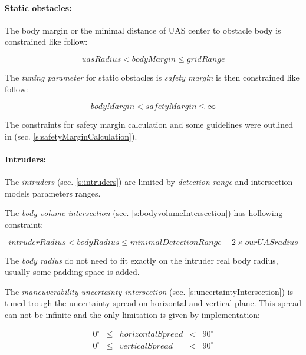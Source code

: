 \paragraph{Static obstacles:} The body margin or the minimal distance of UAS center to obstacle body is constrained like follow:

\begin{equation*}
    uas Radius < body Margin \le grid Range
\end{equation*}

The \emph{tuning parameter} for static obstacles is \emph{safety margin} is then constrained like follow:

\begin{equation*}
    body Margin < safety Margin \le \infty
\end{equation*}


The constraints for safety margin calculation and some guidelines were outlined in (sec. \ref{s:safetyMarginCalculation}).

\paragraph{Intruders:} The \emph{intruders} (sec. \ref{s:intruders}) are limited by \emph{detection range} and intersection models parameters ranges. 

The \emph{body volume intersection} (sec. \ref{s:bodyvolumeIntersection}) has hollowing constraint:

\begin{equation*}
    intruder Radius < body Radius \le minimal Detection Range - 2 \times our UAS radius
\end{equation*}

\begin{note}
    The \emph{body radius} do not need to fit exactly on the intruder real body radius, usually some padding space is added.
\end{note}

The \emph{maneuverability uncertainty intersection} (sec. \ref{s:uncertaintyIntersection}) is tuned trough the uncertainty spread on horizontal and vertical plane. This spread can not be infinite and the only limitation is given by implementation:

\begin{equation*}
    \begin{aligned}
        0^\circ & \le&  horizontal Spread &< &90^\circ\\
        0^\circ & \le&  vertical Spread &< &90^\circ
    \end{aligned}
\end{equation*}



